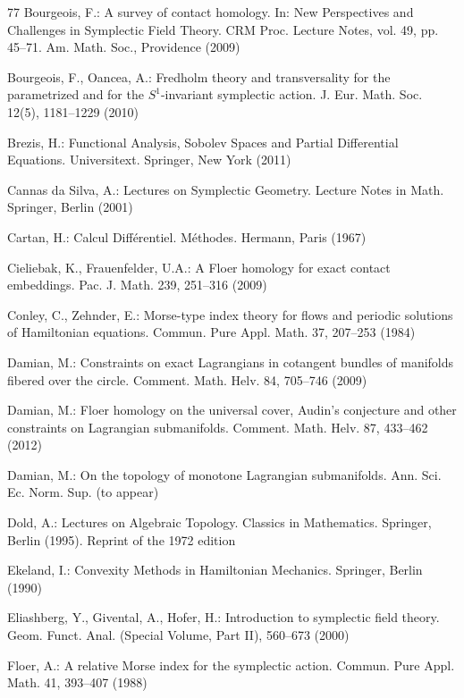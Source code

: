 \begin{thebibliography}{77}
 Bourgeois, F.: A survey of contact homology. In: New Perspectives and Challenges in Symplectic Field Theory. CRM Proc. Lecture Notes, vol. 49, pp. 45–71. Am. Math. Soc., Providence (2009)

 Bourgeois, F., Oancea, A.: Fredholm theory and transversality for the parametrized and for the \ensuremath{S^1}-invariant symplectic action. J. Eur. Math. Soc. 12(5), 1181–1229 (2010)

 Brezis, H.: Functional Analysis, Sobolev Spaces and Partial Differential Equations. Universitext. Springer, New York (2011)

 Cannas da Silva, A.: Lectures on Symplectic Geometry. Lecture Notes in Math. Springer, Berlin (2001)

 Cartan, H.: Calcul Différentiel. Méthodes. Hermann, Paris (1967)

 Cieliebak, K., Frauenfelder, U.A.: A Floer homology for exact contact embeddings. Pac. J. Math. 239, 251–316 (2009)

 Conley, C., Zehnder, E.: Morse-type index theory for flows and periodic solutions of Hamiltonian equations. Commun. Pure Appl. Math. 37, 207–253 (1984)

 Damian, M.: Constraints on exact Lagrangians in cotangent bundles of manifolds fibered over the circle. Comment. Math. Helv. 84, 705–746 (2009)

 Damian, M.: Floer homology on the universal cover, Audin’s conjecture and other constraints on Lagrangian submanifolds. Comment. Math. Helv. 87, 433–462 (2012)

 Damian, M.: On the topology of monotone Lagrangian submanifolds. Ann. Sci. Ec. Norm. Sup. (to appear)

 Dold, A.: Lectures on Algebraic Topology. Classics in Mathematics. Springer, Berlin (1995). Reprint of the 1972 edition

 Ekeland, I.: Convexity Methods in Hamiltonian Mechanics. Springer, Berlin (1990)

 Eliashberg, Y., Givental, A., Hofer, H.: Introduction to symplectic field theory. Geom. Funct. Anal. (Special Volume, Part II), 560–673 (2000)

 Floer, A.: A relative Morse index for the symplectic action. Commun. Pure Appl. Math. 41, 393–407 (1988)


\end{thebibliography}
